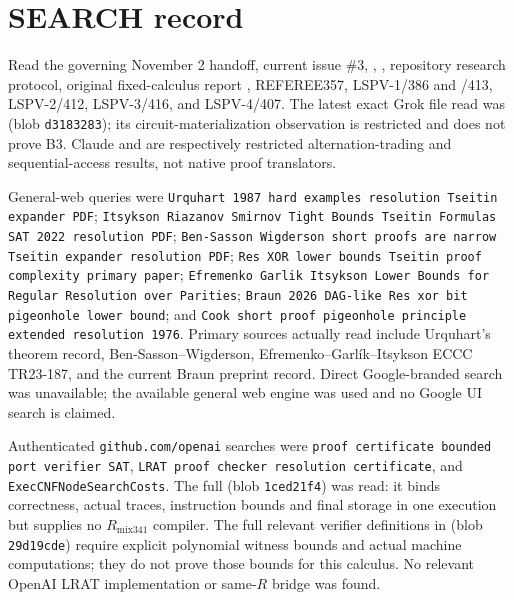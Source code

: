 \documentclass[11pt]{article}
\begin{document}
\section{SEARCH record}

Read the governing November 2 handoff, current issue \#3, , , repository research protocol, original fixed-calculus report , REFEREE357, LSPV-1/386 and /413, LSPV-2/412, LSPV-3/416, and LSPV-4/407.  The latest exact Grok file read was  (blob \texttt{d3183283}); its circuit-materialization observation is restricted and does not prove B3.  Claude  and  are respectively restricted alternation-trading and sequential-access results, not native proof translators.

General-web queries were \texttt{Urquhart 1987 hard examples resolution Tseitin expander PDF}; \texttt{Itsykson Riazanov Smirnov Tight Bounds Tseitin Formulas SAT 2022 resolution PDF}; \texttt{Ben-Sasson Wigderson short proofs are narrow Tseitin expander resolution PDF}; \texttt{Res XOR lower bounds Tseitin proof complexity primary paper}; \texttt{Efremenko Garlik Itsykson Lower Bounds for Regular Resolution over Parities}; \texttt{Braun 2026 DAG-like Res xor bit pigeonhole lower bound}; and \texttt{Cook short proof pigeonhole principle extended resolution 1976}.  Primary sources actually read include Urquhart's theorem record, Ben-Sasson--Wigderson, Efremenko--Garl\'ik--Itsykson ECCC TR23-187, and the current Braun preprint record.  Direct Google-branded search was unavailable; the available general web engine was used and no Google UI search is claimed.

Authenticated \texttt{github.com/openai} searches were \texttt{proof certificate bounded port verifier SAT}, \texttt{LRAT proof checker resolution certificate}, and \texttt{ExecCNFNodeSearchCosts}.  The full  (blob \texttt{1ced21f4}) was read: it binds correctness, actual traces, instruction bounds and final storage in one execution but supplies no $R_{\mathrm{mix341}}$ compiler.  The full relevant verifier definitions in  (blob \texttt{29d19cde}) require explicit polynomial witness bounds and actual machine computations; they do not prove those bounds for this calculus.  No relevant OpenAI LRAT implementation or same-$R$ bridge was found.
\end{document}
